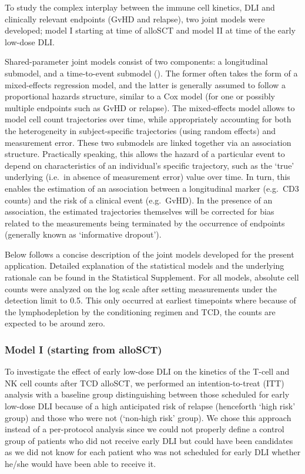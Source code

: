 \documentclass[
  letterpaper,
  DIV=11,
  numbers=noendperiod]{scrreprt}
\begin{document}
To study the complex interplay between the immune cell kinetics, DLI and
clinically relevant endpoints (GvHD and relapse), two joint models were
developed; model I starting at time of alloSCT and model II at time of
the early low-dose DLI.

Shared-parameter joint models consist of two components: a longitudinal
submodel, and a time-to-event submodel
(). The former often takes the form of a mixed-effects regression
model, and the latter is generally assumed to follow a proportional
hazards structure, similar to a Cox model (for one or possibly multiple
endpoints such as GvHD or relapse). The mixed-effects model allows to
model cell count trajectories over time, while appropriately accounting
for both the heterogeneity in subject-specific trajectories (using
random effects) and measurement error. These two submodels are linked
together via an association structure. Practically speaking, this allows
the hazard of a particular event to depend on characteristics of an
individual's specific trajectory, such as the `true' underlying (i.e.~in
absence of measurement error) value over time. In turn, this enables the
estimation of an association between a longitudinal marker (e.g.~CD3
counts) and the risk of a clinical event (e.g.~GvHD). In the presence of
an association, the estimated trajectories themselves will be corrected
for bias related to the measurements being terminated by the occurrence
of endpoints (generally known as `informative dropout').

Below follows a concise description of the joint models developed for
the present application. Detailed explanation of the statistical models
and the underlying rationale can be found in the Statistical Supplement.
For all models, absolute cell counts were analyzed on the log scale
after setting measurements under the detection limit to 0.5. This only
occurred at earliest timepoints where because of the lymphodepletion by
the conditioning regimen and TCD, the counts are expected to be around
zero.

\subsubsection{Model I (starting from
alloSCT)}\label{model-i-starting-from-allosct}

To investigate the effect of early low-dose DLI on the kinetics of the
T-cell and NK cell counts after TCD alloSCT, we performed an
intention-to-treat (ITT) analysis with a baseline group distinguishing
between those scheduled for early low-dose DLI because of a high
anticipated risk of relapse (henceforth `high risk' group) and those who
were not (`non-high risk' group). We chose this approach instead of a
per-protocol analysis since we could not properly define a control group
of patients who did not receive early DLI but could have been candidates
as we did not know for each patient who was not scheduled for early DLI
whether he/she would have been able to receive it.
\end{document}
